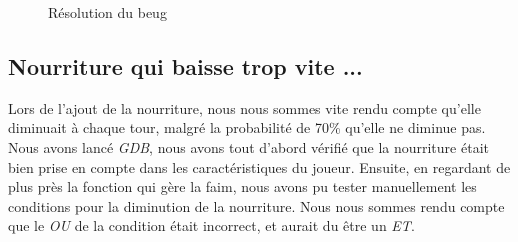 \documentclass[11pt]{report}
\begin{document}
	\newpage

			\begin{figure}[ht]
			    \centering
			    \qquad
			    \caption{Résolution du beug}%
			\end{figure}
		
	\subsection*{Nourriture qui baisse trop vite ...}
		Lors de l'ajout de la nourriture, nous nous sommes vite rendu compte qu'elle diminuait à chaque tour, malgré la probabilité de 70\% qu'elle ne diminue pas. Nous avons lancé \emph{GDB}, nous avons tout d'abord vérifié que la nourriture était bien prise en compte dans les caractéristiques du joueur. Ensuite, en regardant de plus près la fonction qui gère la faim, nous avons pu tester manuellement les conditions pour la diminution de la nourriture. Nous nous sommes rendu compte que le \emph{OU} de la condition était incorrect, et aurait du être un \emph{ET}.
		
\end{document}
